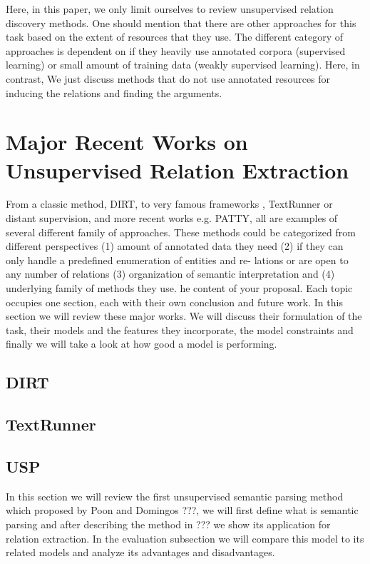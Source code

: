\documentclass[12pt]{report}
\begin{document}
Here, in this paper, we only limit ourselves to review unsupervised relation discovery methods. 
One should mention that there are other approaches for this task based on the extent of resources that they use.
 The different category of approaches is dependent on if they heavily use annotated corpora (supervised learning) or 
 small amount of training data (weakly supervised learning). Here, in contrast, 
 We just discuss methods that do not use annotated resources for inducing the relations and finding the arguments. 



\chapter{Major Recent Works on Unsupervised Relation Extraction}
\label{ch:related}

From a classic method, DIRT, to very famous frameworks ,
TextRunner or distant supervision, and more recent works e.g. PATTY,
all are examples of several different family of approaches. These methods could
be categorized from different perspectives (1) amount of annotated data they
need (2) if they can only handle a predefined enumeration of entities and re-
lations or are open to any number of relations (3) organization of semantic
interpretation and (4) underlying family of methods they use.
he content of your proposal. Each topic occupies one section, each
with their own conclusion and future work.
In this section we will review these major works. We will discuss their formulation of the task, their models
 and the features they incorporate, the model constraints and finally we will take a look at how good a model is performing.


\section{DIRT}
\label{ch:unsupervised}

\section{TextRunner}
\label{ch:unsupervised}

\section{USP}
\label{ch:unsupervised}

In this section we will review the first unsupervised semantic parsing method which proposed by Poon and Domingos ???,
we will first define what is semantic parsing and after describing the method in ??? we show its application for relation extraction.
In the evaluation subsection we will compare this model to its related models and analyze its advantages and disadvantages.
\end{document}
